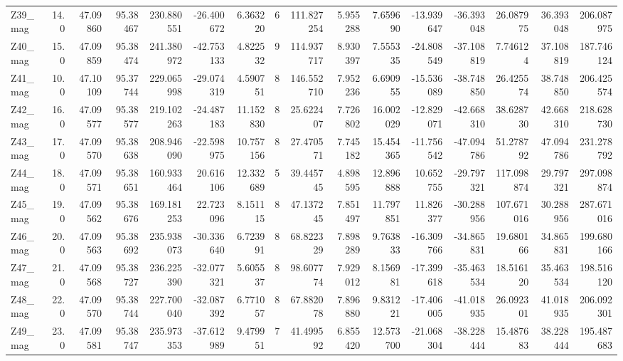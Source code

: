 \documentclass[11pt]{article}
\begin{document}
\begin{sidewaystable}
{\begin{tabular}{lrrrrrrrrrrrrrrr}
Z39\_mag &       14.0 &  47.09860 &  95.38467 &  230.880551 & -26.400672 &   6.363220 &   6 &  111.827254 &  5.955288 &   7.659690 &     -13.939647 & -36.393048 &   26.087975 &    36.393048 &   206.087975 \\
Z40\_mag &       15.0 &  47.09859 &  95.38474 &  241.380972 & -42.753133 &   4.822532 &   9 &  114.937717 &  8.930397 &   7.555335 &     -24.808549 & -37.108819 &    7.746124 &    37.108819 &   187.746124 \\
Z41\_mag &       10.0 &  47.10109 &  95.37744 &  229.065998 & -29.074319 &   4.590751 &   8 &  146.552710 &  7.952236 &   6.690955 &     -15.536089 & -38.748850 &   26.425574 &    38.748850 &   206.425574 \\
Z42\_mag &       16.0 &  47.09577 &  95.38577 &  219.102263 & -24.487183 &  11.152830 &   8 &   25.622407 &  7.726802 &  16.002029 &     -12.829071 & -42.668310 &   38.628730 &    42.668310 &   218.628730 \\
Z43\_mag &       17.0 &  47.09570 &  95.38638 &  208.946090 & -22.598975 &  10.757156 &   8 &   27.470571 &  7.745182 &  15.454365 &     -11.756542 & -47.094786 &   51.278792 &    47.094786 &   231.278792 \\
Z44\_mag &       18.0 &  47.09571 &  95.38651 &  160.933464 &  20.616106 &  12.332689 &   5 &   39.445745 &  4.898595 &  12.896888 &      10.652755 & -29.797321 &  117.098874 &    29.797321 &   297.098874 \\
Z45\_mag &       19.0 &  47.09562 &  95.38676 &  169.181253 &  22.723096 &   8.151115 &   8 &   47.137245 &  7.851497 &  11.797851 &      11.826377 & -30.288956 &  107.671016 &    30.288956 &   287.671016 \\
Z46\_mag &       20.0 &  47.09563 &  95.38692 &  235.938073 & -30.336640 &   6.723991 &   8 &   68.822329 &  7.898289 &   9.763833 &     -16.309766 & -34.865831 &   19.680166 &    34.865831 &   199.680166 \\
Z47\_mag &       21.0 &  47.09568 &  95.38727 &  236.225390 & -32.077321 &   5.605537 &   8 &   98.607774 &  7.929012 &   8.156981 &     -17.399618 & -35.463534 &   18.516120 &    35.463534 &   198.516120 \\
Z48\_mag &       22.0 &  47.09570 &  95.38744 &  227.700040 & -32.087392 &   6.771057 &   8 &   67.882078 &  7.896880 &   9.831221 &     -17.406005 & -41.018935 &   26.092301 &    41.018935 &   206.092301 \\
Z49\_mag &       23.0 &  47.09581 &  95.38747 &  235.973353 & -37.612989 &   9.479951 &   7 &   41.499592 &  6.855420 &  12.573700 &     -21.068304 & -38.228444 &   15.487683 &    38.228444 &   195.487683 \\

\end{tabular}}
\end{sidewaystable}
\end{document}
